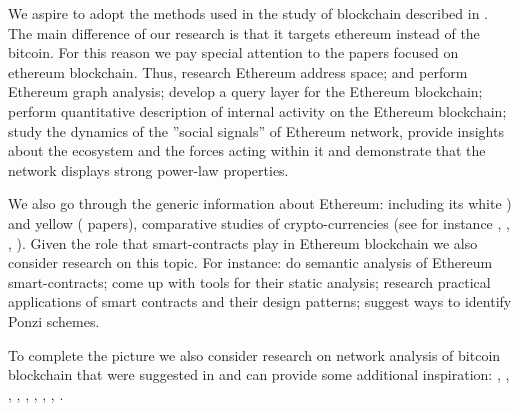 We aspire to adopt the methods used in the study of blockchain described in \cite{lischke2016analyzing}.
The main difference of our research is that it targets ethereum instead of the bitcoin.
For this reason we pay special attention to the papers focused on ethereum blockchain.
Thus,  \cite{payette2017characterizing} research Ethereum address space; 
 \cite{chan2017Ethereum} and  \cite{chen2018understanding} perform Ethereum graph analysis;
 \cite{li2017etherql} develop a query layer for the Ethereum blockchain; 
 \cite{anoaica2018quantitative} perform quantitative description of internal activity on the Ethereum blockchain;  \cite{somin2018social} study the dynamics of the ”social signals” of Ethereum network, provide insights about the ecosystem and the forces acting within it and demonstrate that the network displays strong power-law properties.


We also go through the generic information about Ethereum: including its white  \cite{buterin2014next}) and yellow (\cite{wood2014Ethereum} papers), comparative studies of crypto-currencies (see for instance  \cite{maesa2018blockchain},  \cite{rudlang2017comparative},  \cite{sapuric2017distributed},  \cite{anderson2016new}).
Given the role that smart-contracts play in Ethereum blockchain we also consider research on this topic.
 For instance:  \cite{grishchenko2018semantic} do semantic analysis of Ethereum smart-contracts; 
  \cite{tikhomirov2018smartcheck} come up with tools for their static analysis; 
  \cite{bartoletti2017dissecting} research practical applications of smart contracts and their design patterns;  \cite{bartoletti2017dissecting} suggest ways to identify Ponzi schemes.

To complete the picture we also consider research on network analysis of bitcoin blockchain that were suggested in  \cite{lischke2016analyzing} and can provide some additional inspiration:  \cite{reid2013analysis},  \cite{baumann2014exploring},  \cite{drainville2012analysis},  \cite{ober2013structure},  \cite{meiklejohn2013fistful},   \cite{spagnuolo2014bitiodine},  \cite{androulaki2013evaluating},  \cite{kaminsky2011black},  \cite{ortega2013bitcoin}.
